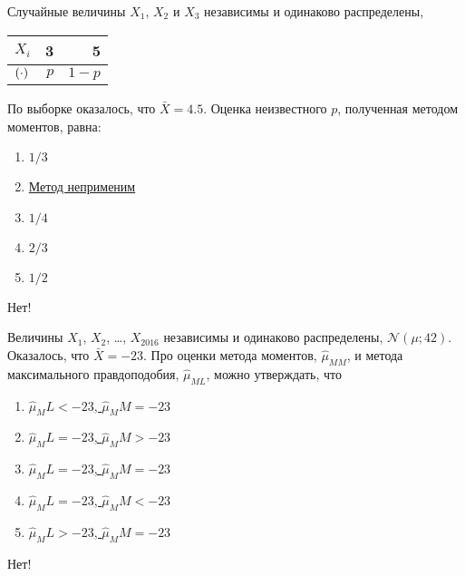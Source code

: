 \documentclass[t]{beamer}
\let\P\relax
\DeclareMathOperator{\P}{\mathbb{P}}
\newcommand{\cN}{\mathcal{N}}
\begin{document}
 \begin{frame} \label{33-No} 
\begin{block}{33} 

    Случайные величины $X_1$, $X_2$ и $X_3$ независимы и одинаково распределены,

\begin{center}
    \begin{tabular}{lrr} \toprule
    $X_i$ & 3 & 5 \\
    \midrule
    $\P(\cdot)$ & $p$ & $1-p$ \\
    \bottomrule
    \end{tabular}
\end{center}

    По выборке оказалось, что $\bar X = 4.5$. Оценка неизвестного $p$, полученная методом моментов, равна:


    


 \end{block} 
\begin{enumerate} 
\item[] \hyperlink{33-No}{\beamergotobutton{} $1/3$}
\item[] \hyperlink{33-No}{\beamergotobutton{} Метод неприменим}
\item[] \hyperlink{33-Yes}{\beamergotobutton{} $1/4$}
\item[] \hyperlink{33-No}{\beamergotobutton{} $2/3$}
\item[] \hyperlink{33-No}{\beamergotobutton{} $1/2$}
\end{enumerate} 

 \alert{Нет!} 
\end{frame} 


 \begin{frame} \label{34-No} 
\begin{block}{34} 

  Величины $X_1$, $X_2$, \ldots, $X_{2016}$ независимы и одинаково распределены, $\cN(\mu ; 42)$. Оказалось, что $\bar X =  -23$. Про оценки метода моментов, $\hat \mu_{MM}$, и метода максимального правдоподобия, $\hat \mu_{ML}$, можно утверждать, что


 \end{block} 
\begin{enumerate} 
\item[] \hyperlink{34-No}{\beamergotobutton{} $\hat \mu_ML < -23$, $\hat\mu_MM = -23$}
\item[] \hyperlink{34-No}{\beamergotobutton{} $\hat \mu_ML = -23$, $\hat\mu_MM > -23$}
\item[] \hyperlink{34-Yes}{\beamergotobutton{} $\hat \mu_ML = -23$, $\hat\mu_MM = -23$}
\item[] \hyperlink{34-No}{\beamergotobutton{} $\hat \mu_ML = -23$, $\hat\mu_MM < -23$}
\item[] \hyperlink{34-No}{\beamergotobutton{} $\hat \mu_ML > -23$, $\hat\mu_MM = -23$}
\end{enumerate} 

 \alert{Нет!} 
\end{frame} 
\end{document}
